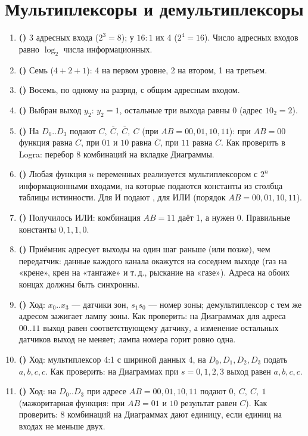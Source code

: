 \section*{Мультиплексоры и демультиплексоры}
\begin{enumerate}
  \item \textbf{()} 3 адресных входа ($2^3=8$); у $16:1$ их 4 ($2^4=16$). Число адресных входов равно $\log_2$ числа информационных.
  \item \textbf{()} Семь ($4+2+1$): 4 на первом уровне, 2 на втором, 1 на третьем.
  \item \textbf{()} Восемь, по одному на разряд, с общим адресным входом.
  \item \textbf{()} Выбран выход $y_2$: $y_2=1$, остальные три выхода равны 0 (адрес $10_2=2$).
  \item \textbf{()} На $D_0..D_3$ подают $C,\ \overline{C},\ \overline{C},\ C$ (при $AB=00,01,10,11$): при $AB=00$ функция равна $C$, при $01$ и $10$ равна $\overline{C}$, при $11$ равна $C$. Как проверить в Logra: перебор 8 комбинаций на вкладке Диаграммы.
  \item \textbf{()} Любая функция $n$ переменных реализуется мультиплексором с $2^n$ информационными входами, на которые подаются константы из столбца таблицы истинности. Для И подают , для ИЛИ  (порядок $AB=00,01,10,11$). 
  \item \textbf{()} Получилось ИЛИ: комбинация $AB=11$ даёт 1, а нужен 0. Правильные константы $0,1,1,0$.
  \item \textbf{()} Приёмник адресует выходы на один шаг раньше (или позже), чем передатчик: данные каждого канала окажутся на соседнем выходе (газ на «крене», крен на «тангаже» и т.\,д., рыскание на «газе»). Адреса на обоих концах должны быть синхронны.
  \item \textbf{()} Ход: $x_0..x_3$ --- датчики зон, $s_1s_0$ --- номер зоны; демультиплексор с тем же адресом зажигает лампу зоны. Как проверить: на Диаграммах для адреса $00..11$ выход равен соответствующему датчику, а изменение остальных датчиков выход не меняет; лампа номера горит ровно одна.
  \item \textbf{()} Ход: мультиплексор 4:1 с шириной данных 4, на $D_0,D_1,D_2,D_3$ подать $a,b,c,c$. Как проверить: на Диаграммах при $s=0,1,2,3$ выход равен $a,b,c,c$.
  \item \textbf{()} Ход: на $D_0..D_3$ при адресе $AB=00,01,10,11$ подают $0,\ C,\ C,\ 1$ (мажоритарная функция: при $AB=01$ и $10$ результат равен $C$). Как проверить: 8 комбинаций на Диаграммах дают единицу, если единиц на входах не меньше двух.
\end{enumerate}

